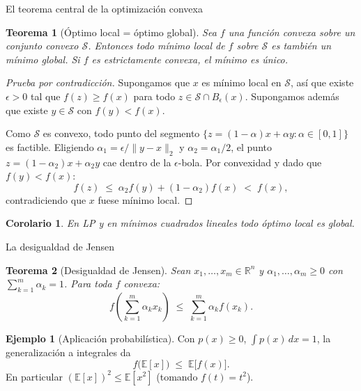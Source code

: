 \documentclass[10pt,aspectratio=169]{beamer}
\theoremstyle{definition}
\newtheorem{ejemplo}{Ejemplo}
\theoremstyle{plain}
\newtheorem{teorema}{Teorema}
\newtheorem{corolario}{Corolario}
\begin{document}
\begin{frame}[t]{El teorema central de la optimización convexa}
  \begin{teorema}[Óptimo local = óptimo global]
    Sea $f$ una función convexa sobre un conjunto convexo $\mathcal{S}$.
    Entonces todo \emph{mínimo local} de $f$ sobre $\mathcal{S}$ es también
    un \emph{mínimo global}. Si $f$ es estrictamente convexa, el mínimo
    es único.
  \end{teorema}

  \begin{proof}[Prueba por contradicción]
    Supongamos que $x$ es mínimo local en $\mathcal{S}$, así que existe
    $\epsilon>0$ tal que $f(z)\geq f(x)$ para todo $z\in\mathcal{S}\cap B_{\epsilon}(x)$.
    Supongamos además que existe $y\in\mathcal{S}$ con $f(y)<f(x)$.

    Como $\mathcal{S}$ es convexo, todo punto del segmento
    $\{z=(1-\alpha)x+\alpha y:\alpha\in[0,1]\}$ es factible. Eligiendo
    $\alpha_{1}=\epsilon/\|y-x\|_{2}$ y $\alpha_{2}=\alpha_{1}/2$, el punto
    $z=(1-\alpha_{2})x+\alpha_{2}y$ cae dentro de la $\epsilon$-bola.
    Por convexidad y dado que $f(y)<f(x)$:
    \[
      f(z) \;\leq\; \alpha_{2}f(y)+(1-\alpha_{2})f(x) \;<\; f(x),
    \]
    contradiciendo que $x$ fuese mínimo local.
  \end{proof}

  \vspace{0.15em}
  \begin{corolario}
    En LP y en mínimos cuadrados lineales \emph{todo óptimo local es global}.
  \end{corolario}
\end{frame}

\begin{frame}[t]{La desigualdad de Jensen}
  \begin{teorema}[Desigualdad de Jensen]
    Sean $x_{1},\dots,x_{m}\in\mathbb{R}^{n}$ y $\alpha_{1},\dots,\alpha_{m}\geq 0$
    con $\sum_{k=1}^{m}\alpha_{k}=1$. Para toda $f$ convexa:
    \[
      f\!\left(\sum_{k=1}^{m}\alpha_{k}x_{k}\right)
      \;\leq\; \sum_{k=1}^{m}\alpha_{k}f(x_{k}).
    \]
  \end{teorema}

  \vspace{0.2em}
  \begin{ejemplo}[Aplicación probabilística]
    Con $p(x)\geq 0$, $\int p(x)\,dx=1$, la generalización a integrales da
    \[
      f\bigl(\mathbb{E}[x]\bigr) \;\leq\; \mathbb{E}\bigl[f(x)\bigr].
    \]
    En particular $(\mathbb{E}[x])^{2}\leq\mathbb{E}[x^{2}]$ (tomando $f(t)=t^{2}$).
  \end{ejemplo}

  
\end{frame}
\end{document}
